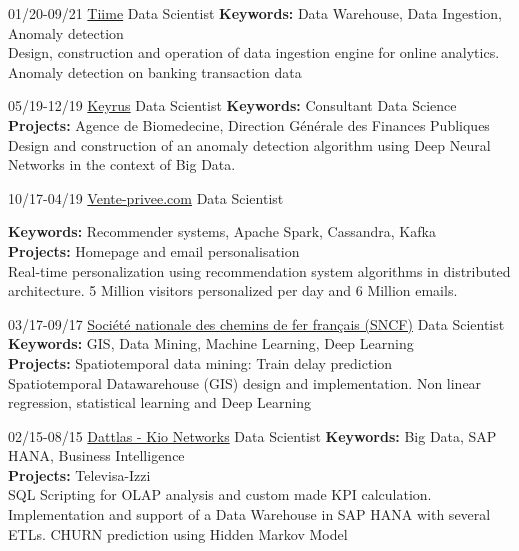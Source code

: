 \documentclass[]{friggeri-cv}
\begin{document}
\begin{entrylist}
\entry
{01/20-09/21}
{\href{https://www.tiime.fr/}{Tiime}}
{Data Scientist} 
{\textbf{Keywords:} Data Warehouse, Data Ingestion, Anomaly detection \\
Design, construction and operation of data ingestion engine for online analytics. Anomaly detection on banking transaction data}

\entry
{05/19-12/19}
{\href{https://www.keyrus.com/}{Keyrus}}
{Data Scientist} 
{\textbf{Keywords:} Consultant Data Science\\
	\textbf{Projects:} Agence de Biomedecine, Direction Générale des Finances Publiques \\
Design and construction of an anomaly detection algorithm using Deep Neural Networks in the context of Big Data.
}
	
\entry
{10/17-04/19}
{\href{http://vente-privee.com}{Vente-privee.com}}
{Data Scientist} 
{\textbf{Keywords:} Recommender systems, Apache Spark, Cassandra, Kafka\\%
	\textbf{Projects:} Homepage and email personalisation  \\
	Real-time personalization using recommendation system algorithms in distributed architecture. 5 Million visitors personalized per day and 6 Million emails. %
	
}	
	
\entry
{03/17-09/17}
{\href{http://www.sncf.com/}{Société nationale des chemins de fer français (SNCF)}}
{Data Scientist} 
{\textbf{Keywords:} GIS, Data Mining, Machine Learning, Deep Learning\\
	\textbf{Projects:} Spatiotemporal data mining: Train delay prediction \\
	Spatiotemporal Datawarehouse (GIS) design and implementation. 
	Non linear regression, statistical learning and Deep Learning }
	
\entry
{02/15-08/15}
{\href{http://www.dattlas.com}{Dattlas - Kio Networks}}
{Data Scientist} 
{\textbf{Keywords:} Big Data, SAP HANA, Business Intelligence\\
\textbf{Projects:} Televisa-Izzi \\
SQL Scripting for OLAP analysis and custom made KPI calculation.
Implementation and support of a Data Warehouse in SAP HANA with several ETLs.
CHURN prediction using Hidden Markov Model}


\end{entrylist}
\end{document}
